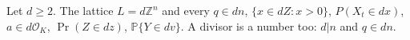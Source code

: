 \documentclass{article}
\begin{document}
Let $d\geq 2$. The lattice $L=d\mathbb{Z}^n$ and every $q\in dn$, $\{x\in dZ: x>0\}$, $P(X_t\in dx)$, $a\in d\mathcal{O}_K$,
$\Pr(Z\in dz)$, $\mathbb{P}\{Y\in dv\}$.
A divisor is a number too: $d|n$ and $q\in dn$.
\end{document}
